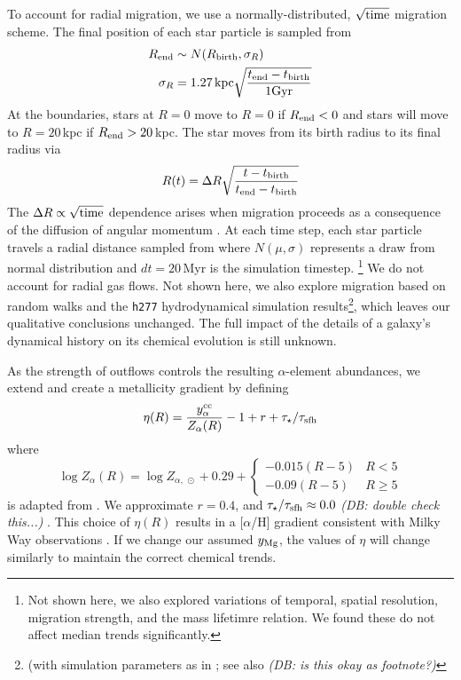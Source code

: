 \documentclass[fleqn,
usenatbib]{mnras}
\newcommand{\JJ}{\citetalias{james+21}}
\newcommand{\dbnote}[1]{ {\color{Thistle} \textit{\small (DB: #1)}} }
\begin{document}
To account for radial migration, we use a normally-distributed, $\sqrt{\rm time}$ migration scheme. The final position of each star particle is sampled from
\begin{subequations}
\begin{align}
        R_{\rm end} &\sim N(R_{\rm birth}, \sigma_R ) \\
        \sigma_{R} &= 1.27\,{\rm kpc} \sqrt{\frac{t_{\rm end} - t_{\rm birth}}{1 \rm Gyr}}
\end{align}
\end{subequations}
At the boundaries, stars at $R=0$ move to $R=0$ if $R_{\rm end}<0$ and stars will move to $R=20$\,kpc if $R_{\rm end} > 20$\,kpc. 
The star moves from its birth radius to its final radius via
\begin{equation}
        R(t) = \Delta R \sqrt{\frac{t - t_{\rm birth}}{t_{\rm end} - t_{\rm birth}}}
\end{equation}
The $\Delta R \propto \sqrt{\rm time}$ dependence arises when migration proceeds as a consequence of the diffusion of angular momentum \citep{frankel18, frankel20}.
At each time step, each star particle travels a radial distance sampled from 
where $N(\mu, \sigma)$ represents a draw from normal distribution and $dt=20$\,Myr is the simulation timestep.%
\footnote{Not shown here, we also explored variations of temporal, spatial resolution, migration strength, and the mass lifetimre relation. We found these do not affect median trends significantly.}
We do not account for radial gas flows.
Not shown here, we also explore migration based on random walks and the \texttt{h277} hydrodynamical
simulation results\footnote{(with simulation parameters as in \citealt{bird+21}; see also \citealt{christensen12, zolotov12, loebman12, BZ14} \dbnote{is this okay as footnote?} }, which leaves our qualitative conclusions unchanged. 
The full impact of the details of a galaxy's dynamical history on its chemical evolution is still unknown.

As the strength of outflows controls the resulting $\alpha$-element abundances, we extend \JJ and create a metallicity gradient by defining
\begin{equation}\label{eq:mass_loading}
\eta(R) = \frac{y_{\alpha}^{\rm cc}}{Z_{\alpha}(R)} -1 + r + \tau_{\star} / \tau_{\rm sfh} 
\end{equation}
where 
\begin{equation}
    \log Z_{\alpha}(R) = \log Z_{\alpha,\ \odot} + 
    0.29 + 
    \begin{cases}
        -0.015(R-5) & R < 5 \\
        -0.09(R-5) & R \geq 5
    \end{cases}
\end{equation}
is adapted from \citet{hayden+14}.  We approximate $r=0.4$, and $\tau_\star/\tau_{\rm sfh} \approx 0.0$ \dbnote{double check this...}.
This choice of $\eta(R)$ results in a [$\alpha$/H] gradient consistent with Milky Way observations \citep[e.g.][]{hayden+14, weinberg+19, frinchaboy+13}.
If we change our assumed $y_{\rm Mg}$, the values of $\eta$ will change similarly to maintain the correct chemical trends.
\end{document}
